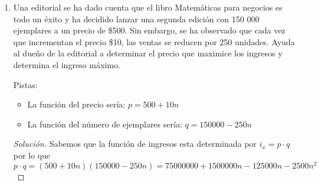 \documentclass[12pt]{article}
\newenvironment{solution}{\begin{proof}[Solución]}{\end{proof}}
\begin{document}
\begin{enumerate}
    La función de ingresos en función del precio se expresa de la siguiente forma:
    \[i_{(p)} = 1500p-2p^2\]
    \begin{solution}
        Para maximizar los ingresos usamos la formula y obtenemos \[x = \frac{-b}{2a} = \frac{-1500}{-4} = 375\] por lo que el precio sugerido sería de\$375
    \end{solution}

    \item Una editorial se ha dado cuenta que el libro Matemáticas para negocios es todo un
    éxito y ha decidido lanzar una segunda edición con 150 000 ejemplares a un
    precio de \$500. Sin embargo, se ha observado que cada vez que incrementan el
    precio \$10, las ventas se reducen por 250 unidades. Ayuda al dueño de la editorial
    a determinar el precio que maximice los ingresos y determina el ingreso máximo.

    Pistas: \begin{itemize}
        \item La función del precio sería: $p = 500+10n$
        \item La función del número de ejemplares sería: $q = 150000-250n$
    \end{itemize} \begin{solution}
        Sabemos que la función de ingresos esta determinada por $i_x = p \cdot q$ por lo que
        \[p \cdot q = (500+10n)(150000-250n) = 75 000 000 + 1500000n - 125 000n - 2500 n^2\]
    \end{solution}
\end{enumerate}


\end{document}
